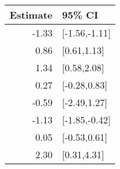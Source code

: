 \begin{tabular}{rl}
  \hline
Estimate & 95\% CI \\ 
  \hline
-1.33 & [-1.56,-1.11] \\ 
  0.86 & [0.61,1.13] \\ 
  1.34 & [0.58,2.08] \\ 
  0.27 & [-0.28,0.83] \\ 
  -0.59 & [-2.49,1.27] \\ 
  -1.13 & [-1.85,-0.42] \\ 
  0.05 & [-0.53,0.61] \\ 
  2.30 & [0.31,4.31] \\ 
   \hline
\end{tabular}


